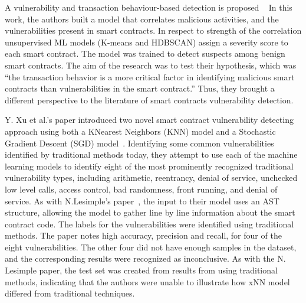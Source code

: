 A vulnerability and transaction behaviour-based detection is proposed ~\cite{contractfuzzer}
 In this work, the authors built a model that correlates malicious activities, and the vulnerabilities present in smart contracts.
 In respect to strength of the correlation unsupervised ML models (K-means and HDBSCAN) assign a severity score to each smart contract.
 The model was trained to detect suspects among benign smart contracts. The aim of the research was to test their hypothesis,
 which was “the transaction behavior is a more critical factor in identifying malicious smart contracts than vulnerabilities in the smart contract.” Thus, they brought a different perspective
 to the literature of smart contracts vulnerability detection.

Y. Xu et al.'s paper introduced two novel smart contract vulnerability detecting approach using both a KNearest Neighbors (KNN) model and a Stochastic Gradient Descent (SGD) model~\cite{slither}.
Identifying some common vulnerabilities identified by traditional methods today, they attempt to use each of the machine learning models to identify eight of the most prominently recognized
traditional vulnerability types, including arithmetic, reentrancy, denial of service, unchecked low level calls, access control, bad randomness, front running, and denial of service.
As with N.Lesimple's paper~\cite{he2019learning}, the input to their model uses an AST structure, allowing the model to gather line by line information about the smart contract code.
The labels for the vulnerabilities were identified using traditional methods.
The paper notes high accuracy, precision and recall, for four of the eight vulnerabilities.
The other four did not have enough samples in the dataset, and the corresponding results were recognized as inconclusive.
As with the N. Lesimple paper, the test set was created from results from using traditional methods,
indicating that the authors were unable to illustrate how xNN model differed from traditional techniques.

